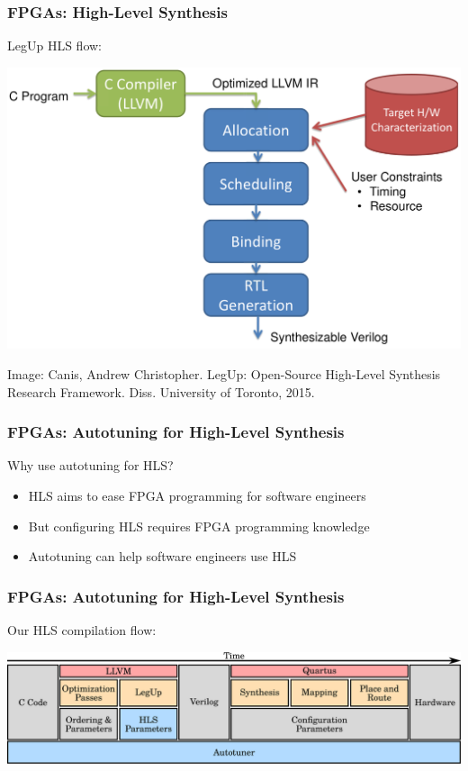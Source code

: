 \documentclass[10pt, compress, xcolor={table,xcdraw,usenames}, aspectratio=169]{beamer}
\begin{document}
\begin{frame}
    \frametitle{FPGAs: High-Level Synthesis}
    \begin{block}{\alert{LegUp} HLS flow:}
    \begin{center}
        \includegraphics[width=.6\textwidth]{legup_flow}

        \scriptsize{Image: Canis, Andrew Christopher. LegUp: Open-Source
        High-Level Synthesis Research Framework. Diss. University of Toronto,
        2015.}
    \end{center}
    \end{block}
\end{frame}

\begin{frame}
    \frametitle{FPGAs: Autotuning for High-Level Synthesis}
    \begin{block}{Why use \alert{autotuning for HLS?}}
        \begin{itemize}
            \item HLS aims to \alert{ease FPGA programming for software engineers}
            \item But \alert{configuring HLS requires FPGA programming knowledge}
            \item \alert{Autotuning can help software engineers use HLS}
        \end{itemize}
    \end{block}
\end{frame}

\begin{frame}
    \frametitle{FPGAs: Autotuning for High-Level Synthesis}
    \begin{block}{Our HLS \alert{compilation flow}:}
    \begin{center}
        \includegraphics[width=.9\textwidth]{fpga-stack}
    \end{center}
    \end{block}
\end{frame}
\end{document}
